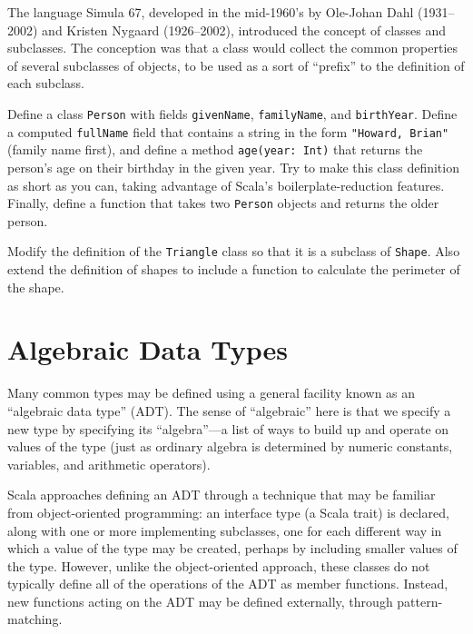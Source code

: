 \begin{tailquote}
The language Simula 67, developed in the mid-1960's by Ole-Johan Dahl (1931--2002) and Kristen Nygaard (1926--2002), introduced the concept of classes and subclasses. The conception was that a class would collect the common properties of several subclasses of objects, to be used as a sort of ``prefix'' to the definition of each subclass.\end{tailquote}
\begin{exercises}
\problem Define a class \texttt{Person} with fields \texttt{givenName}, \texttt{familyName}, and \texttt{birthYear}. Define a computed \texttt{fullName} field that contains a string in the form \verb|"Howard, Brian"| (family name first), and define a method \verb|age(year: Int)| that returns the person's age on their birthday in the given year. Try to make this class definition as short as you can, taking advantage of Scala's boilerplate-reduction features. Finally, define a function that takes two \texttt{Person} objects and returns the older person.

\problem Modify the definition of the \texttt{Triangle} class so that it is a subclass of \texttt{Shape}. Also extend the definition of shapes to include a function to calculate the perimeter of the shape.

\end{exercises}

\section{Algebraic Data Types}
Many common types may be defined using a general facility known as an ``algebraic data type'' (ADT). The sense of ``algebraic'' here is that we specify a new type by specifying its ``algebra''---a list of ways to build up and operate on values of the type (just as ordinary algebra is determined by numeric constants, variables, and arithmetic operators).

Scala approaches defining an ADT through a technique that may be familiar from object-oriented programming: an interface type (a Scala trait) is declared, along with one or more implementing subclasses, one for each different way in which a value of the type may be created, perhaps by including smaller values of the type. However, unlike the object-oriented approach, these classes do not typically define all of the operations of the ADT as member functions. Instead, new functions acting on the ADT may be defined externally, through pattern-matching.

